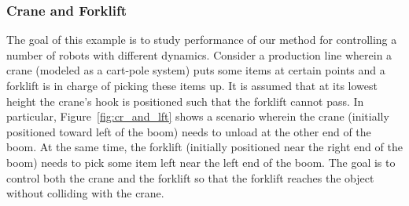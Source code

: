 %





\subsubsection{Crane and Forklift}
The goal of this example is to study performance of our method for controlling a number of robots with different dynamics. Consider a production line wherein a crane (modeled as a cart-pole system) puts some items at certain points and a forklift is in charge of picking these items up. It is assumed that at its lowest height the crane's hook is positioned such that the forklift cannot pass. In particular, Figure~\ref{fig:cr_and_lft} shows a scenario wherein the crane (initially positioned toward left of the boom) needs to unload at the other end of the boom. At the same time, the forklift (initially positioned near the right end of the boom) needs to pick some item left near the left end of the boom. The goal is to control both the crane and the forklift so that the forklift reaches the object without colliding with the crane. 


